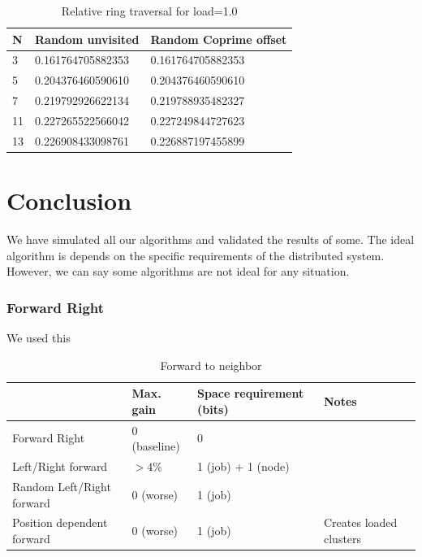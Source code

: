 \documentclass[10pt,a4paper]{article}
\begin{document}
\begin{table}[h!]
\centering
\begin{tabular}{|l|l|l|} \hline
N	& Random unvisited	& Random Coprime offset \\ \hline
3	&   0.161764705882353 &  0.161764705882353 \\
5	&   0.204376460590610 &  0.204376460590610 \\
7	&   0.219792926622134 &  0.219788935482327 \\
11	&   0.227265522566042 &  0.227249844727623 \\
13	&   0.226908433098761 &  0.226887197455899 \\ \hline
\end{tabular}
\caption{Relative ring traversal for load=1.0}
\end{table}

\section{Conclusion}
\label{secconclusion}

We have simulated all our algorithms and validated the results of some. The ideal algorithm is depends on the specific requirements of the distributed system. However, we can say some algorithms are not ideal for any situation.

\subsubsection*{Forward Right}
We used this 



\begin{table}[h!]
\centering
\begin{tabular}{|p{}|p{}|p{}|p{}|} \hline
							& Max. gain		& Space requirement (bits)	& Notes \\ \hline
Forward Right				& 0 (baseline)	& 0							&		\\ \hline
Left/Right forward			& $> 4\%$		& 1 (job) + 1 (node)		&		\\ \hline
Random Left/Right forward	& 0 (worse)		& 1 (job)					&		\\ \hline
Position dependent forward	& 0 (worse)		& 1 (job)					& Creates loaded clusters \\ \hline
\end{tabular}
\caption{Forward to neighbor}
\end{table}
\end{document}
